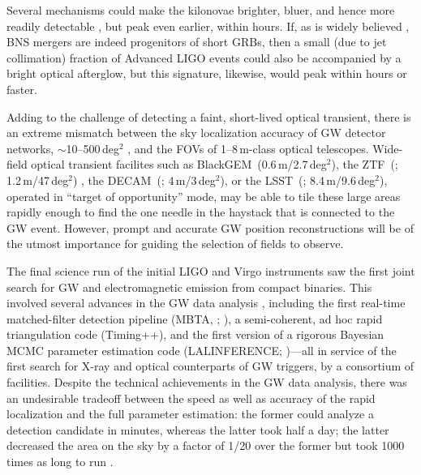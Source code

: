 \documentclass[amsmath,amssymb,aps,prx,reprint,nopreprintnumbers,nofootinbib,showpacs]{revtex4-1}
\begin{document}
Several mechanisms could make the kilonovae brighter, bluer, and hence more readily detectable \citep{KilonovaPrecursor,KilonovaRedOrBlue}, but peak even earlier, within hours. If, as is widely believed \citep{1986ApJ...308L..43P,1989Natur.340..126E,1992ApJ...395L..83N,2011ApJ...732L...6R}, \ac{BNS} mergers are indeed progenitors of short \acp{GRB}, then a small (due to jet collimation) fraction of Advanced \ac{LIGO} events could also be accompanied by a bright optical afterglow, but this signature, likewise, would peak within hours or faster.

Adding to the challenge of detecting a faint, short-lived optical transient, there is an extreme mismatch between the sky localization accuracy of \ac{GW} detector networks, $\sim$10\nobreakdashes--500\,deg$^2$ \citep{FairhurstTriangulation,WenLocalizationAdvancedLIGO,FairhurstLocalizationAdvancedLIGO,2011PhRvD..84j4020V,RodriguezBasicParameterEstimation,NissankeLocalization,NissankeKasliwalEMCounterparts,KasliwalTwoDetectors,Grover:2013,SiderySkyLocalizationComparison,FirstTwoYears}, and the \acp{FOV} of 1\nobreakdashes--8\,m\nobreakdashes-class optical telescopes. Wide\nobreakdashes-field optical transient facilites such as BlackGEM~(0.6\,m/2.7\,deg$^2$), the \acl{ZTF}~(; 1.2\,m/47\,deg$^2$) \cite{ZTF}, the \acl{DECAM}~(; 4\,m/3\,deg$^2$), or the \acl{LSST}~(; 8.4\,m/9.6\,deg$^2$), operated in ``target of opportunity'' mode, may be able to tile these large areas rapidly enough to find the one needle in the haystack that is connected to the \ac{GW} event. However, prompt and accurate \ac{GW} position reconstructions will be of the utmost importance for guiding the selection of fields to observe.

The final science run of the initial LIGO and Virgo instruments saw the first joint search for \ac{GW} and electromagnetic emission from compact binaries. This involved several advances in the \ac{GW} data analysis \citep{CBCLowLatency}, including the first real\nobreakdashes-time matched\nobreakdashes-filter detection pipeline (\acs{MBTA}, ; \cite{LIGOVirgoInspiralPipelineComparison}), a semi\nobreakdashes-coherent, ad hoc rapid triangulation code (Timing++), and the first version of a rigorous Bayesian \ac{MCMC} parameter estimation code (LALINFERENCE; \citealt{S6PE})---all in service of the first search for X\nobreakdashes-ray \citep{SwiftFollowup} and optical \citep{OpticalImageAnalysis} counterparts of \ac{GW} triggers, by a consortium of facilities. Despite the technical achievements in the \ac{GW} data analysis, there was an undesirable tradeoff between the speed as well as accuracy of the rapid localization and the full parameter estimation: the former could analyze a detection candidate in minutes, whereas the latter took half a day; the latter decreased the area on the sky by a factor of 1/20 over the former but took 1000 times as long to run \cite{SiderySkyLocalizationComparison}.
\end{document}
